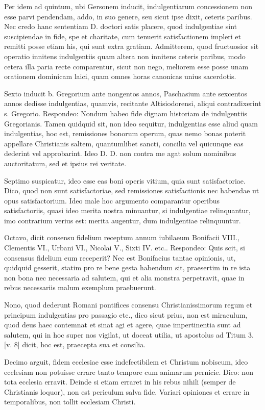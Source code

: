 Per idem ad quintum, ubi Gersonem inducit, indulgentiarum concessionem non esse parvi pendendam, addo, in suo genere, seu sicut ipse dixit, ceteris paribus. Nec credo hanc sententiam D. doctori satis placere, quod indulgentiae sint suscipiendae in fide, spe et charitate, cum tenuerit satisfactionem impleri et remitti posse etiam his, qui sunt extra gratiam. Admitterem, quod fructuosior sit operatio innitens indulgentiis quam altera non innitens ceteris paribus, modo cetera illa paria recte comparentur, sicut non nego, meliorem esse posse unam orationem dominicam laici, quam omnes horas canonicas unius sacerdotis.

Sexto inducit b. Gregorium ante nongentos annos, Paschasium ante sexcentos annos dedisse indulgentias, quamvis, recitante Altisiodorensi, aliqui contradixerint s. Gregorio. Respondeo: Nondum habeo fide dignam historiam de indulgentiis Gregorianis. Tamen quidquid sit, non ideo sequitur, indulgentias esse aliud quam indulgentias, hoc est, remissiones bonorum operum, quas nemo bonas poterit appellare Christianis saltem, quantumlibet sancti, concilia vel quicunque eas dederint vel approbarint. Ideo D. D. non contra me agat solum nominibus auctoritatum, sed et ipsius rei veritate.

Septimo suspicatur, ideo esse eas boni operis vitium, quia sunt satisfactoriae. Dico, quod non sunt satisfactoriae, sed remissiones satisfactionis nec habendae ut opus satisfactorium. Ideo male hoc argumento comparantur operibus satisfactoriis, quasi ideo merita nostra minuantur, si indulgentiae relinquantur, imo contrarium verius est: merita augentur, dum indulgentiae relinquuntur.

Octavo, dicit consensu fidelium receptum annum iubilaeum Bonifacii VIII., Clementis VI., Urbani VI., Nicolai V., Sixti IV. etc.. Respondeo: Quis scit, si consensus fidelium eum receperit? Nec est Bonifacius tantae opinionis, ut, quidquid gesserit, statim pro re bene gesta habendum sit, praesertim in re ista non bona nec necessaria ad salutem, qui et alia monstra perpetravit, quae in rebus necessariis malum exemplum praebuerunt.

Nono, quod dederunt Romani pontifices consensu Christianissimorum regum et principum indulgentias pro passagio etc., dico sicut prius, non est miraculum, quod deus haec contemnat et sinat agi et agere, quae impertinentia sunt ad salutem, qui in hoc super nos vigilat, ut doceat utilia, ut apostolus ad Titum 3. [v. 8] dicit, hoc est, praecepta sua et consilia.

Decimo arguit, fidem ecclesiae esse indefectibilem et Christum nobiscum, ideo ecclesiam non potuisse errare tanto tempore cum animarum pernicie. \marginpar{\small[349]} Dico: non tota ecclesia erravit. Deinde si etiam erraret in his rebus nihili (semper de Christianis loquor), non est periculum salva fide. Variari opiniones et errare in temporalibus, non tollit ecclesiam Christi.

